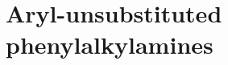 \chapter{Aryl-unsubstituted phenylalkylamines}
\clearpage

\clearpage


\clearpage


\clearpage


\clearpage


\clearpage


\clearpage


\clearpage


\clearpage


\clearpage


\clearpage


\clearpage


\clearpage


\clearpage


\clearpage


\clearpage


\clearpage


\clearpage


\clearpage


\clearpage


\clearpage
